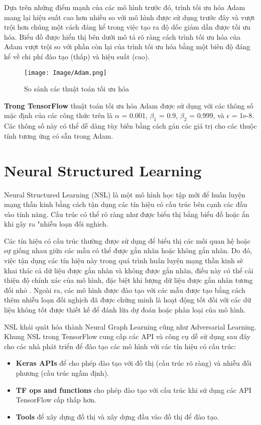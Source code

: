 Dựa trên những điểm mạnh của các mô hình trước đó, trình tối ưu hóa Adam mang lại hiệu suất cao hơn nhiều so với mô hình được sử dụng trước đây và vượt trội hơn
chúng một cách đáng kể trong việc tạo ra độ dốc giảm dần được tối ưu hóa. Biểu đồ được hiển thị bên dưới mô tả rõ ràng cách trình tối ưu hóa của Adam vượt trội 
so với phần còn lại của trình tối ưu hóa bằng một biên độ đáng kể về chi phí đào tạo (thấp) và hiệu suất (cao). 

\begin{figure}[h!]
    \centering
    \texttt{[image: Image/Adam.png]}
    \caption{So sánh các thuật toán tối ưu hóa}
    \label{Hình 1.1: Graph Neural Network}
    \cite*{WEBSITE:3}
\end{figure}


\textbf{Trong TensorFlow} thuật toán tối ưu hóa Adam được sử dụng với các thông số mặc định của các công thức trên là $\alpha$ = 0.001, $\beta_1$ = 0.9, $\beta_2$ = 0.999, và $\epsilon$ = 1e-8. 
Các thông số này có thể dễ dàng tùy biến bằng cách gán các giá trị cho các thuộc tính tương ứng có sẵn trong Adam.


\section{Neural Structured Learning}
Neural Structured Learning (NSL) là một mô hình học tập mới để huấn luyện mạng thần kinh bằng cách tận dụng các tín hiệu có cấu trúc bên cạnh các đầu vào tính 
năng. Cấu trúc có thể rõ ràng như được biểu thị bằng biểu đồ hoặc ẩn khi gây ra "nhiễu loạn đối nghich.

Các tín hiệu có cấu trúc thường được sử dụng để biểu thị các mối quan hệ hoặc sự giống nhau giữa các mẫu có thể được gắn nhãn hoặc không gắn nhãn. Do đó, việc 
tận dụng các tín hiệu này trong quá trình huấn luyện mạng thần kinh sẽ khai thác cả dữ liệu được gắn nhãn và không được gắn nhãn, điều này có thể cải thiện độ 
chính xác của mô hình, đặc biệt khi lượng dữ liệu được gắn nhãn tương đối nhỏ . Ngoài ra, các mô hình được đào tạo với các mẫu được tạo bằng cách thêm nhiễu loạn 
đối nghịch đã được chứng minh là hoạt động tốt đối với các dữ liệu không tốt được thiết kế để đánh lừa dự đoán hoặc phân loại của mô hình.

NSL khái quát hóa thành Neural Graph Learning cũng như Adversarial Learning. Khung NSL trong TensorFlow cung cấp các API và công cụ dễ sử dụng sau đây cho các 
nhà phát triển để đào tạo các mô hình với các tín hiệu có cấu trúc:
\begin{itemize}
    \item \textbf{Keras APIs} để cho phép đào tạo với đồ thị (cấu trúc rõ ràng) và nhiễu đối phương (cấu trúc ngầm định).
    \item \textbf{TF ops and functions} cho phép đào tạo với cấu trúc khi sử dụng các API TensorFlow cấp thấp hơn.
    \item \textbf{Tools} để xây dựng đồ thị và xây dựng đầu vào đồ thị để đào tạo.
\end{itemize}

